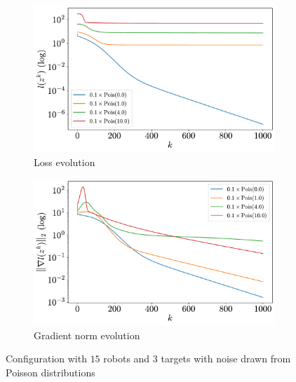 \documentclass[a4paper,11pt,oneside]{book}
\begin{document}
\begin{figure}[ht]
      \centering
      \begin{subfigure}[t]{0.49\textwidth}
            \centering
            \includegraphics[width=\linewidth]{./figs/tracking/loss_poisson_15_3_2_1000.pdf} 
            \caption{Loss evolution}
      \end{subfigure}
      \hfill
      \begin{subfigure}[t]{0.49\textwidth}
            \centering
            \includegraphics[width=\linewidth]{./figs/tracking/gradient_poisson_15_3_2_1000.pdf} 
            \caption{Gradient norm evolution}
      \end{subfigure}
      \caption{Configuration with $15$ robots and $3$ targets with noise drawn from Poisson distributions}
      \label{fig:tracking_poisson_15_3}
\end{figure}
\end{document}
